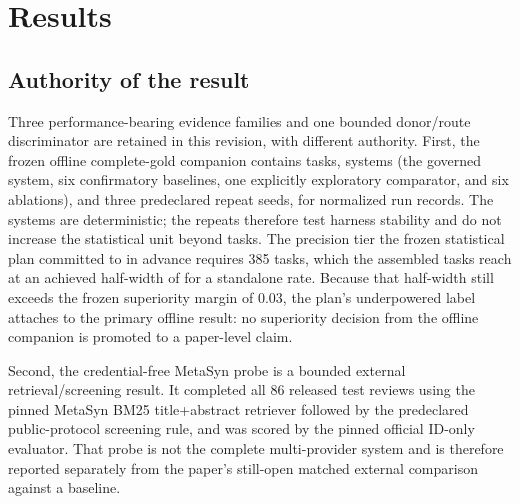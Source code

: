 \section{Results}
\label{sec:results}

\subsection{Authority of the result}
Three performance-bearing evidence families and one bounded donor/route
discriminator are retained in this revision, with different authority.  First,
the frozen offline complete-gold companion contains
\OfflineTaskCount{} tasks, \OfflineSystemCount{} systems (the governed system, six confirmatory baselines, one explicitly
exploratory comparator, and six ablations), and three predeclared repeat seeds,
for \OfflineRunRecordCount{} normalized run records.  The systems are deterministic; the repeats
therefore test harness stability and do not increase the statistical unit beyond
\OfflineTaskCount{} tasks.  The precision tier the frozen statistical plan committed to in advance
requires 385 tasks, which the assembled \OfflineTaskCount{} tasks reach at an
achieved half-width of \OfflineAchievedHalfWidth{} for a standalone rate.
Because that half-width still exceeds the frozen superiority margin of 0.03,
the plan's underpowered label attaches to the primary offline result: no
superiority decision from the offline companion is promoted to a paper-level
claim.

Second, the credential-free MetaSyn probe is a bounded external
retrieval/screening result.  It completed all 86 released test reviews using the
pinned MetaSyn BM25 title+abstract retriever followed by the predeclared
public-protocol screening rule, and was scored by the pinned official ID-only
evaluator.  That probe is not the complete multi-provider system and is
therefore reported separately from the paper's still-open matched external
comparison against a baseline.

